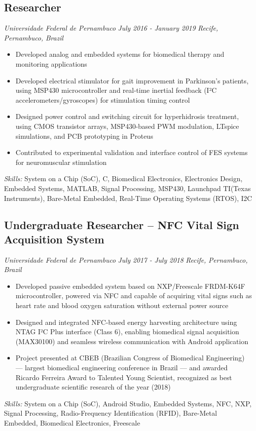 \documentclass[11pt,a4paper]{article}
\begin{document}
\subsection{Researcher}
\textit{Universidade Federal de Pernambuco} \hfill \textit{July 2016 - January 2019}
\textit{Recife, Pernambuco, Brazil}
\begin{itemize}
    \item Developed analog and embedded systems for biomedical therapy and monitoring applications
    \item Developed electrical stimulator for gait improvement in Parkinson's patients, using MSP430 microcontroller and real-time inertial feedback (I²C accelerometers/gyroscopes) for stimulation timing control
    \item Designed power control and switching circuit for hyperhidrosis treatment, using CMOS transistor arrays, MSP430-based PWM modulation, LTspice simulations, and PCB prototyping in Proteus
    \item Contributed to experimental validation and interface control of FES systems for neuromuscular stimulation
\end{itemize}
\textit{Skills:} System on a Chip (SoC), C, Biomedical Electronics, Electronics Design, Embedded Systems, MATLAB, Signal Processing, MSP430, Launchpad TI(Texas Instruments), Bare-Metal Embedded, Real-Time Operating Systems (RTOS), I2C

\subsection{Undergraduate Researcher – NFC Vital Sign Acquisition System}
\textit{Universidade Federal de Pernambuco} \hfill \textit{July 2017 - July 2018}
\textit{Recife, Pernambuco, Brazil}
\begin{itemize}
    \item Developed passive embedded system based on NXP/Freescale FRDM-K64F microcontroller, powered via NFC and capable of acquiring vital signs such as heart rate and blood oxygen saturation without external power source
    \item Designed and integrated NFC-based energy harvesting architecture using NTAG I²C Plus interface (Class 6), enabling biomedical signal acquisition (MAX30100) and seamless wireless communication with Android application
    \item Project presented at CBEB (Brazilian Congress of Biomedical Engineering) — largest biomedical engineering conference in Brazil — and awarded Ricardo Ferreira Award to Talented Young Scientist, recognized as best undergraduate scientific research of the year (2018)
\end{itemize}
\textit{Skills:} System on a Chip (SoC), Android Studio, Embedded Systems, NFC, NXP, Signal Processing, Radio-Frequency Identification (RFID), Bare-Metal Embedded, Biomedical Electronics, Freescale
\end{document}
